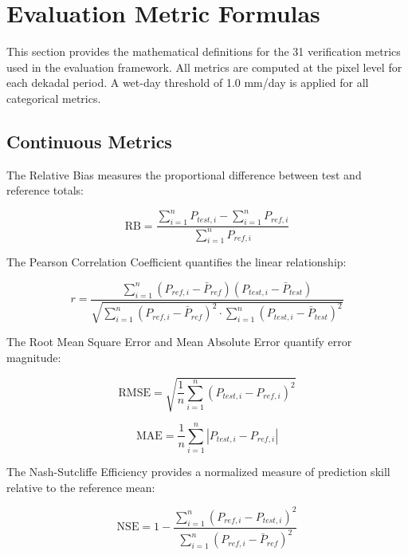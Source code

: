 \documentclass[11pt,a4paper]{article}
\begin{document}
\section{Evaluation Metric Formulas}\label{sec:s2}

This section provides the mathematical definitions for the 31 verification metrics used in the evaluation framework. All metrics are computed at the pixel level for each dekadal period. A wet-day threshold of 1.0 mm/day is applied for all categorical metrics.

\subsection{Continuous Metrics}

The Relative Bias measures the proportional difference between test and reference totals:

\begin{equation}\text{RB} = \frac{\sum_{i=1}^{n} P_{test,i} - \sum_{i=1}^{n} P_{ref,i}}{\sum_{i=1}^{n} P_{ref,i}}\end{equation}

The Pearson Correlation Coefficient quantifies the linear relationship:

\begin{equation}r = \frac{\sum_{i=1}^{n}(P_{ref,i} - \bar{P}_{ref})(P_{test,i} - \bar{P}_{test})}{\sqrt{\sum_{i=1}^{n}(P_{ref,i} - \bar{P}_{ref})^2 \cdot \sum_{i=1}^{n}(P_{test,i} - \bar{P}_{test})^2}}\end{equation}

The Root Mean Square Error and Mean Absolute Error quantify error magnitude:

\begin{equation}\text{RMSE} = \sqrt{\frac{1}{n} \sum_{i=1}^{n} (P_{test,i} - P_{ref,i})^2}\end{equation}

\begin{equation}\text{MAE} = \frac{1}{n} \sum_{i=1}^{n} |P_{test,i} - P_{ref,i}|\end{equation}

The Nash-Sutcliffe Efficiency provides a normalized measure of prediction skill relative to the reference mean:

\begin{equation}\text{NSE} = 1 - \frac{\sum_{i=1}^{n}(P_{ref,i} - P_{test,i})^2}{\sum_{i=1}^{n}(P_{ref,i} - \bar{P}_{ref})^2}\end{equation}
\end{document}
